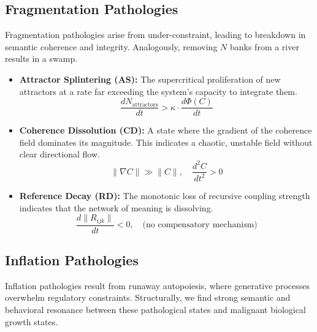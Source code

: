 \subsection{Fragmentation Pathologies}
\label{16.1.2:fragmentation_pathologies}

Fragmentation pathologies arise from under-constraint, leading to breakdown in semantic coherence and integrity. Analogously, removing \(N\) banks from a river results in a swamp.

\begin{itemize}
    
    \item \textbf{Attractor Splintering (AS):} The supercritical proliferation of new attractors at a rate far exceeding the system's capacity to integrate them.
    \begin{equation}
    \frac{dN_{\text{attractors}}}{dt} > \kappa \cdot \frac{d\Phi(C)}{dt}
    \end{equation}

    \item \textbf{Coherence Dissolution (CD):} A state where the gradient of the coherence field dominates its magnitude. This indicates a chaotic, unstable field without clear directional flow.
    \begin{equation}
    \|\nabla C\| \gg \|C\|, \quad \frac{d^2C}{dt^2} > 0
    \end{equation}

    \item \textbf{Reference Decay (RD):} The monotonic loss of recursive coupling strength indicates that the network of meaning is dissolving.
    \begin{equation}
    \frac{d\|R_{ijk}\|}{dt} < 0, \quad \text{(no compensatory mechanism)}
    \end{equation}

\end{itemize}


\subsection{Inflation Pathologies}
\label{16.1.3:inflation_pathologies}

Inflation pathologies result from runaway autopoiesis, where generative processes overwhelm regulatory constraints. Structurally, we find strong semantic and behavioral resonance between these pathological states and malignant biological growth states.

